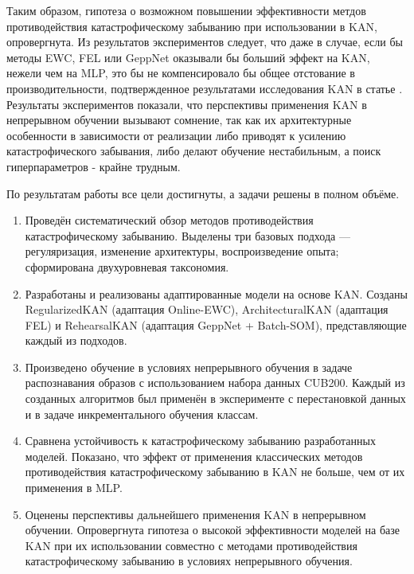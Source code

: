 \documentclass[a4paper,14pt]{extarticle}
\begin{document}
Таким образом, гипотеза о возможном повышении эффективности метдов противодействия
катастрофическому забыванию при использовании в KAN, опровергнута. Из результатов экспериментов
следует, что даже в случае, если бы методы EWC, FEL или GeppNet оказывали бы больший
эффект на KAN, нежели чем на MLP, это бы не компенсировало бы общее отстование в производительности,
подтвержденное результатами исследования KAN в статье \cite{yu2024kan}. Результаты 
экспериментов показали, что перспективы применения KAN в непрерывном обучении
вызывают сомнение, так как их архитектурные особенности в зависимости от реализации
либо приводят к усилению катастрофического забывания, либо делают обучение
нестабильным, а поиск гиперпараметров - крайне трудным.
\pagebreak


По результатам работы все цели достигнуты, а задачи решены в полном объёме.
\begin{enumerate}
    \item Проведён систематический обзор методов противодействия катастрофическому забыванию.
        Выделены три базовых подхода — регуляризация, изменение архитектуры, воспроизведение опыта;
        сформирована двухуровневая таксономия.
    \item Разработаны и реализованы адаптированные модели на основе KAN.
        Созданы RegularizedKAN (адаптация Online-EWC), ArchitecturalKAN (адаптация FEL)
        и RehearsalKAN (адаптация GeppNet + Batch-SOM), представляющие каждый из подходов.
    \item Произведено обучение в условиях непрерывного обучения в задаче
        распознавания образов с использованием набора данных CUB200. Каждый
        из созданных алгоритмов был применён в эксперименте с перестановкой данных
        и в задаче инкрементального обучения классам.
    \item Сравнена устойчивость к катастрофическому забыванию разработанных моделей.
        Показано, что эффект от применения классических методов противодействия
        катастрофическому забыванию в KAN не больше, чем от их применения в MLP.
    \item Оценены перспективы дальнейшего применения KAN в непрерывном обучении.
        Опровергнута гипотеза о высокой эффективности моделей на базе
        KAN при их использовании совместно с методами противодействия
        катастрофическому забыванию в условиях непрерывного обучения.
\end{enumerate}
\pagebreak
\end{document}
